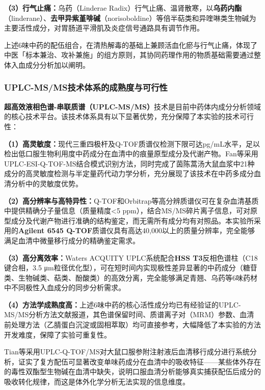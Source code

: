 \documentclass[12pt,a4paper,UTF8,scheme=chinese]{ctexart}
\newcommand{\compoundname}[1]{\textbf{#1}}
\newcommand{\keyterm}[1]{\textbf{#1}}
\begin{document}
\textbf{（3）行气止痛：}乌药（Linderae Radix）行气止痛、温肾散寒，以\compoundname{乌药内酯}（linderane）、\compoundname{去甲异紫堇啡碱}（norisoboldine）等倍半萜类和异喹啉类生物碱为主要活性成分，对胃肠道平滑肌及炎症信号通路具有调节作用\cite{Lv2023}。

上述6味中药的配伍组合，在清热解毒的基础上兼顾活血化瘀与行气止痛，体现了中医「标本兼治、攻补兼施」的组方原则，其协同药理作用的物质基础需要通过整体入血成分分析加以阐明。

\subsubsection{UPLC-MS/MS技术体系的成熟度与可行性}

\keyterm{超高效液相色谱-串联质谱（UPLC-MS/MS）}技术是目前中药体内成分分析领域的核心技术平台。该技术体系具有以下显著优势，充分保障了本实验的技术可行性：

\textbf{（1）高灵敏度：}现代三重四极杆及Q-TOF质谱仪检测下限可达pg/mL水平，足以检出低口服生物利用度中药成分在血清中的痕量原型成分及代谢产物。Fan等\cite{Fan2011}采用UPLC-ESI-Q-TOF-MS结合模式识别方法，同时完成了茵陈蒿汤大鼠血浆中21种成分的高灵敏度检测与半定量药代动力学分析，充分展现了该技术在中药多成分血清分析中的灵敏度优势。

\textbf{（2）高分辨率与高特异性：}Q-TOF和Orbitrap等高分辨质谱仪可在复杂血清基质中提供精确分子量信息（质量精度<5 ppm），结合MS/MS碎片离子信息，可对原型成分及代谢产物进行准确的结构鉴定，而无需所有成分均有对照品。本实验所采用的\keyterm{Agilent 6545 Q-TOF}质谱仪具有高达40,000以上的质量分辨率，完全能够满足血清中微量移行成分的精确鉴定需求。

\textbf{（3）高分离效率：}Waters ACQUITY UPLC系统配合\keyterm{HSS T3}反相色谱柱（C18键合相，3.5 μm粒径优化型），可在短时间内实现极性差异显著的中药成分（糖苷类、生物碱类、萜类、酚酸类）的高效分离，完全能够满足青翘、乌药等6味药材中不同极性入血成分的同步分析需求。

\textbf{（4）方法学成熟度高：}上述6味中药的核心活性成分均已有经验证的UPLC-MS/MS分析方法文献报道\cite{FengX2020,LiuYi2020,Sunsong2021,Tong2010}，其色谱保留时间、质谱离子对（MRM）参数、血清前处理方法（乙腈蛋白沉淀或固相萃取）均可直接参考，大幅降低了本实验的方法开发难度，保障了实验可重复性。

Tian等\cite{AMMS2015}采用UPLC-Q-TOF/MS对大鼠口服参附注射液后血清移行成分进行系统分析，证实了复方配伍可显著改变单味药成分在血清中的吸收特征——某些体外存在的毒性双酯型生物碱在血清中缺失，说明口服血清分析能够真实捕获配伍后成分的吸收转化规律，而这是体外化学分析无法实现的信息维度。
\end{document}

